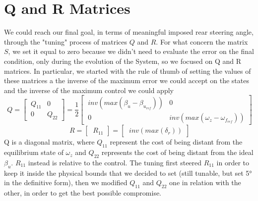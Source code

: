 \section{Q and R Matrices}
We could reach our final goal, in terms of meaningful imposed rear steering angle, through the "tuning" process of matrices $Q$ and $R$. For what concern the matrix $S$, we set it equal to zero because we didn't need to evaluate the error on the final condition, only during the evolution of the System, so we focused on Q and R matrices. In particular, we started with the rule of thumb of setting the values of these matrices a the inverse of the maximum error we could accept on the states and the inverse of the maximum control we could apply
\begin{equation} \label{Q MAtrix}
	\ Q =
	\begin{bmatrix}
	\ Q_{11} & 0\\
	\ 0 & Q_{22}
	\end{bmatrix} = \frac{1}{2}
	\begin{bmatrix}
	\ inv(max(\beta_{u}-\beta_{u_{ref}})) & 0\\
	\ 0 & inv(max(\omega_{z}-\omega_{f_{ref}}))
	\end{bmatrix}
\end{equation}
\begin{equation} \label{R MAtrix}
	\ R =
	\begin{bmatrix}
	\ R_{11}
	\end{bmatrix} =
	\begin{bmatrix}
	\ inv(max(\delta_{r}))
	\end{bmatrix}
\end{equation}
Q is a diagonal matrix, where $ Q_{11} $ represent the cost of being distant from the equilibrium state of $ \omega_{z} $ and $ Q_{22} $ represents the cost of being distant from the ideal $ \beta_{u} $. $ R_{11} $ instead is relative to the control.
The tuning first steered $ R_{11} $ in order to keep it inside the physical bounds that we decided to set (still tunable, but set 5° in the definitive form), then we modified $ Q_{11} $ and $ Q_{22} $ one in relation with the other, in order to get the best possible compromise.

